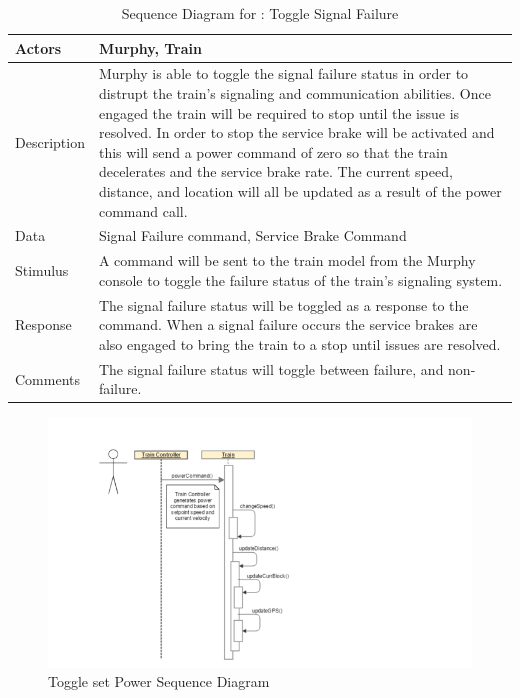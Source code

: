 \documentclass[]{article}
\begin{document}
\begin{table}[H]
	\centering
	\caption{Sequence Diagram for : Toggle Signal Failure}
	\begin{tabular}{|l|l|}
		\hline
		Actors & \parbox[t]{10cm}{Murphy, Train} \\ \hline
		Description & \parbox[t]{10cm}{Murphy is able to toggle the signal failure status in order to distrupt the train's signaling and communication abilities. Once engaged the train will be required to stop until the issue is resolved. In order to stop the service brake will be activated and this will send a power command of zero so that the train decelerates and the service brake rate. The current speed, distance, and location will all be updated as a result of the power command call.} \\ \hline
		Data &  \parbox[t]{10cm}{Signal Failure command, Service Brake Command} \\ \hline
		Stimulus &  \parbox[t]{10cm}{A command will be sent to the train model from the Murphy console to toggle the failure status of the train's signaling system.} \\ \hline
		Response & \parbox[t]{10cm}{The signal failure status will be toggled as a response to the command. When a signal failure occurs the service brakes are also engaged to bring the train to a stop until issues are resolved.}\\ \hline
		Comments & \parbox[t]{10cm}{The signal failure status will toggle between failure, and non-failure.}  \\ \hline
	\end{tabular}
\end{table}

\begin{figure}[H]
	\centering
	\includegraphics[scale=.5]{train_model_sqd_set_power.png}
	\caption{Toggle set Power Sequence Diagram}
\end{figure}
\end{document}
